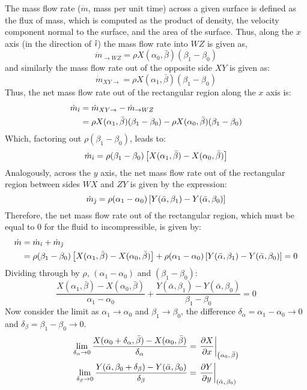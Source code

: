 The mass flow rate ($\dot{m}$, mass per unit time) across a given surface is defined as the flux of mass, which is computed as the product of density, the velocity component normal to the
surface, and the area of the surface. Thus, along the $x$ axis (in the direction of $\hat{\imath}$) the mass flow rate into $WZ$ is given as,
$$
    \dot{m}_{\rightarrow WZ}=\rho X(\alpha_0,\bar{\beta})(\beta_1-\beta_0)
$$
and similarly the mass flow rate out of the opposite side $XY$ is given as:
$$
    \dot{m}_{XY\rightarrow}=\rho X(\alpha_1,\bar{\beta})(\beta_1-\beta_0)
$$
Thus, the net mass flow rate out of the rectangular region along the $x$ axis is:
\begin{align*}
    \dot{m}_{\hat{\imath}}&=\dot{m}_{XY\rightarrow}-\dot{m}_{\rightarrow WZ}\\
    &=\rho X(\alpha_1,\bar{\beta})(\beta_1-\beta_0)-\rho X(\alpha_0,\bar{\beta})(\beta_1-\beta_0)
\end{align*}
Which, factoring out $\rho(\beta_1-\beta_0)$, leads to:
$$
    \dot{m}_{\hat{\imath}}=\rho(\beta_1-\beta_0)\left[X(\alpha_1,\bar{\beta})-X(\alpha_0,\bar{\beta})\right]
$$
Analogously, across the $y$ axis, the net mass flow rate out of the rectangular region between sides $WX$ and $ZY$ is given by the expression:
$$
    \dot{m}_{\hat{\jmath}}=\rho(\alpha_1-\alpha_0)\left[Y(\bar{\alpha},\beta_1)-Y(\bar{\alpha},\beta_0)\right]
$$
Therefore, the net mass flow rate out of the rectangular region, which must be equal to 0 for the fluid to incompressible, is given by:
\begin{align*}
    \dot{m}&=\dot{m}_{\hat{\imath}}+\dot{m}_{\hat{\jmath}}\\
    &=\rho(\beta_1-\beta_0)\left[X(\alpha_1,\bar{\beta})-X(\alpha_0,\bar{\beta})\right]+\rho(\alpha_1-\alpha_0)\left[Y(\bar{\alpha},\beta_1)-Y(\bar{\alpha},\beta_0)\right]=0
\end{align*}
Dividing through by $\rho$, $(\alpha_1-\alpha_0)$ and $(\beta_1-\beta_0)$:
$$
    \frac{X(\alpha_1,\bar{\beta})-X(\alpha_0,\bar{\beta})}{\alpha_1-\alpha_0}+\frac{Y(\bar{\alpha},\beta_1)-Y(\bar{\alpha},\beta_0)}{\beta_1-\beta_0}=0
$$
Now consider the limit as $\alpha_1\rightarrow\alpha_0$ and $\beta_1\rightarrow\beta_0$, the difference $\delta_\alpha=\alpha_1-\alpha_0\rightarrow0$ and $\delta_\beta=\beta_1-\beta_0\rightarrow0$.
\begin{align*}
    \lim_{\delta_\alpha\rightarrow0}\frac{X(\alpha_0+\delta_\alpha,\bar{\beta})-X(\alpha_0,\bar{\beta})}{\delta_\alpha}&=\eval{\pdv{X}{x}}_{\point{\alpha_0}{\bar{\beta}}}\\
    \lim_{\delta_\beta\rightarrow0}\frac{Y(\bar{\alpha},\beta_0+\delta_\beta)-Y(\bar{\alpha},\beta_0)}{\delta_\beta}&=\eval{\pdv{Y}{y}}_{\point{\bar{\alpha}}{\beta_0}}
\end{align*}
